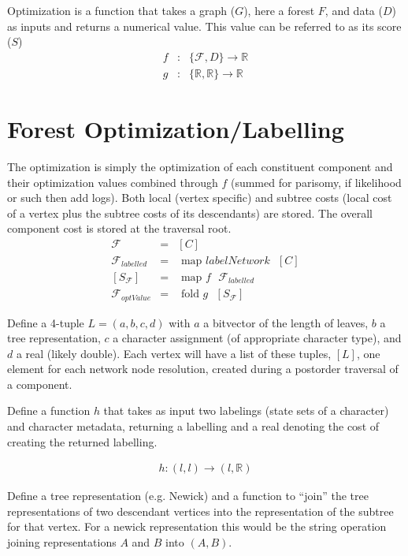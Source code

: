 \documentclass[11pt]{article}
\begin{document}
Optimization is a function that takes a graph ($G$), here a forest $F$, and data ($D$) as inputs and returns a numerical value.  
This value can be referred to as its score ($S$)
 	\begin{eqnarray*}
 		f & : &  \{\mathcal{F}, D\} \rightarrow \mathbb{R}\\
		g & : & \{  \mathbb{R},  \mathbb{R} \} \rightarrow \mathbb{R}
	 \end{eqnarray*}
 
\section{Forest Optimization/Labelling}\label{Forest Optimization/Labelling}

The optimization is simply the optimization of each constituent component and their optimization values combined through $f$ (summed for parisomy, if likelihood or such then add logs). 
Both local (vertex  specific) and subtree costs (local cost of a vertex plus the subtree costs of its descendants) are stored.
The overall component cost is stored at the traversal root.
     \begin{eqnarray*}
     	\mathcal{F} & = & [C]\\
	\mathcal{F}_{labelled} & = & \text{ map } labelNetwork \text{ } [C]\\
	\left[ S_{\mathcal{F}} \right] &=& \text{ map } f \text{ } \mathcal{F}_{labelled}\\
	\mathcal{F}_{optValue} &=& \text{ fold } g \text{ } \left[ S_{\mathcal{F}} \right] 
    \end{eqnarray*}
 
Define a 4-tuple $L = (a, b, c, d)$ with $a$ a bitvector of the length of leaves, $b$ a tree representation, $c$ a character assignment (of appropriate character type), and $d$ a real (likely double).
Each vertex will have a list of these tuples, $\left[L\right]$, one element for each network node resolution, created during a postorder traversal of a component.
 
Define a function $h$ that takes as input two labelings (state sets of a character) and character metadata, returning a labelling and a real denoting the cost of creating the returned labelling.
 
     \begin{eqnarray*}
     	h : \left(l , l \right) \rightarrow \left( l ,  \mathbb{R} \right)
    \end{eqnarray*}

Define a tree representation (e.g. Newick) and a function to ``join'' the tree representations of two descendant vertices into the representation of the subtree for that vertex.
For a newick representation this would be the string operation joining representations $A$ and $B$ into $\left( A, B \right)$.
\end{document}
